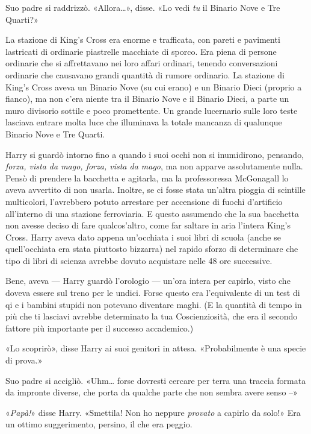 Suo padre si raddrizzò. «Allora…», disse. «Lo vedi \textit{tu} il Binario Nove e Tre Quarti?»

La stazione di King’s Cross era enorme e trafficata, con pareti e pavimenti lastricati di ordinarie piastrelle macchiate di sporco. Era piena di persone ordinarie che si affrettavano nei loro affari ordinari, tenendo conversazioni ordinarie che causavano grandi quantità di rumore ordinario. La stazione di King’s Cross aveva un Binario Nove (su cui erano) e un Binario Dieci (proprio a fianco), ma non c’era niente tra il Binario Nove e il Binario Dieci, a parte un muro divisorio sottile e poco promettente. Un grande lucernario sulle loro teste lasciava entrare molta luce che illuminava la totale mancanza di qualunque Binario Nove e Tre Quarti.

Harry si guardò intorno fino a quando i suoi occhi non si inumidirono, pensando, \textit{forza, vista da mago, forza, vista da mago}, ma non apparve assolutamente nulla. Pensò di prendere la bacchetta e agitarla, ma la professoressa McGonagall lo aveva avvertito di non usarla. Inoltre, se ci fosse stata un’altra pioggia di scintille multicolori, l’avrebbero potuto arrestare per accensione di fuochi d’artificio all’interno di una stazione ferroviaria. E questo assumendo che la sua bacchetta non avesse deciso di fare qualcos’altro, come far saltare in aria l’intera King’s Cross. Harry aveva dato appena un’occhiata i suoi libri di scuola (anche se quell’occhiata era stata piuttosto bizzarra) nel rapido sforzo di determinare che tipo di libri di scienza avrebbe dovuto acquistare nelle 48 ore successive.

Bene, aveva — Harry guardò l’orologio — un’ora intera per capirlo, visto che doveva essere sul treno per le undici. Forse questo era l’equivalente di un test di qi e i bambini stupidi non potevano diventare maghi. (E la quantità di tempo in più che ti lasciavi avrebbe determinato la tua Coscienziosità, che era il secondo fattore più importante per il successo accademico.)

«Lo scoprirò», disse Harry ai suoi genitori in attesa. «Probabilmente è una specie di prova.»

Suo padre si accigliò. «Uhm… forse dovresti cercare per terra una traccia formata da impronte diverse, che porta da qualche parte che non sembra avere senso –»

«\textit{Papà!}» disse Harry. «Smettila! Non ho neppure \textit{provato} a capirlo da solo!» Era un ottimo suggerimento, persino, il che era peggio.

